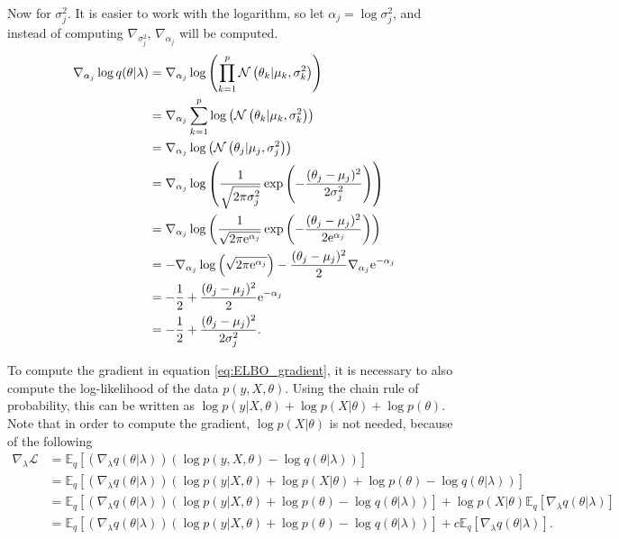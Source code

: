 Now for $\sigma_j^2$. It is easier to work with the logarithm, so let $\alpha_j = \log \sigma_j^2$, and instead of computing $\nabla_{\sigma_j^2}$, $\nabla_{\alpha_j}$ will be computed.
\begin{equation}
  \begin{split}
      \nabla_{\alpha_j} \log q(\theta | \lambda) & =
      \nabla_{\alpha_j} \log \left( \prod_{ k = 1}^p \mathcal{N}\left( \theta_k | \mu_k, \sigma_k^2 \right) \right) \\
      &= \nabla_{\alpha_j} \sum_{ k = 1}^p \log \left( \mathcal{N}\left( \theta_k | \mu_k, \sigma_k^2 \right) \right) \\
      &= \nabla_{\alpha_j} \log \left( \mathcal{N}\left( \theta_j | \mu_j, \sigma_j^2 \right) \right) \\
      &= \nabla_{\alpha_j} \log \left( \frac{1}{\sqrt{2 \pi \sigma_j^2}} \exp \left( -\frac{(\theta_j - \mu_j)^2}{2 \sigma_j^2} \right) \right) \\
      &= \nabla_{\alpha_j} \log \left( \frac{1}{\sqrt{2 \pi \mathrm{e}^{\alpha_j}}} \exp \left( -\frac{(\theta_j - \mu_j)^2}{2 \mathrm{e}^{\alpha_j}} \right) \right) \\
      &= - \nabla_{\alpha_j} \log \left( \sqrt{2 \pi \mathrm{e}^{\alpha_j}} \right) - \frac{(\theta_j - \mu_j)^2}{2} \nabla_{\alpha_j} \mathrm{e}^{-\alpha_j}\\
      &= - \frac{1}{2} + \frac{(\theta_j - \mu_j)^2}{2} \mathrm{e}^{-\alpha_j} \\
      &= - \frac{1}{2} + \frac{(\theta_j - \mu_j)^2}{2 \sigma_j^2}.
  \end{split}
\end{equation}

To compute the gradient in equation \ref{eq:ELBO_gradient}, it is necessary to also compute the log-likelihood of the data $p(y, X, \theta)$. Using the chain rule of probability, this can be written as $\log p(y | X, \theta) + \log p(X | \theta) + \log p(\theta)$. Note that in order to compute the gradient, $\log p(X | \theta)$ is not needed, because of the following
\begin{equation*}
  \begin{split}
      \nabla_{\lambda} \mathcal{L} &=
      \mathbb{E}_q \left[ \left( \nabla_{\lambda} q(\theta | \lambda) \right) \left( \log p(y, X, \theta) - \log q(\theta | \lambda) \right) \right] \\
      &= \mathbb{E}_q \left[ \left( \nabla_{\lambda} q(\theta | \lambda) \right) \left( \log p(y | X, \theta) + \log p(X | \theta) + \log p(\theta) - \log q(\theta | \lambda) \right) \right] \\
      &= \mathbb{E}_q \left[ \left( \nabla_{\lambda} q(\theta | \lambda) \right) \left( \log p(y | X, \theta) + \log p(\theta) - \log q(\theta | \lambda) \right) \right] +  \log p(X | \theta) \mathbb{E}_q \left[ \nabla_{\lambda} q(\theta | \lambda) \right] \\
      &= \mathbb{E}_q \left[ \left( \nabla_{\lambda} q(\theta | \lambda) \right) \left( \log p(y | X, \theta) + \log p(\theta) - \log q(\theta | \lambda) \right) \right] +  c \mathbb{E}_q \left[ \nabla_{\lambda} q(\theta | \lambda) \right].
  \end{split}
\end{equation*}

